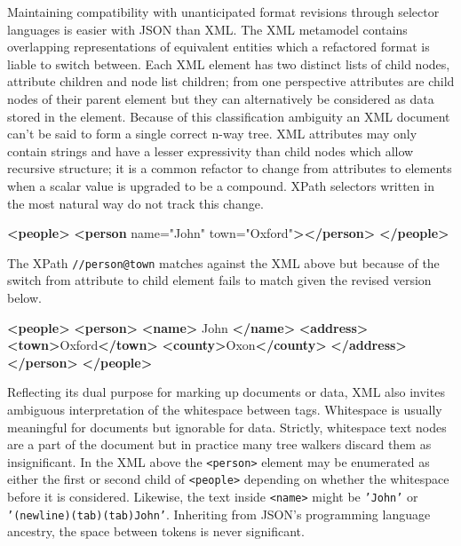 \documentclass[12pt, ]{article}
\newenvironment{Shaded}{}{}
\newcommand{\KeywordTok}[1]{\textcolor[rgb]{0.00,0.44,0.13}{\textbf{{#1}}}}
\newcommand{\StringTok}[1]{\textcolor[rgb]{0.25,0.44,0.63}{{#1}}}
\newcommand{\OtherTok}[1]{\textcolor[rgb]{0.00,0.44,0.13}{{#1}}}
\newcommand{\NormalTok}[1]{{#1}}
\begin{document}
Maintaining compatibility with unanticipated format revisions through
selector languages is easier with JSON than XML. The XML metamodel
contains overlapping representations of equivalent entities which a
refactored format is liable to switch between. Each XML element has two
distinct lists of child nodes, attribute children and node list
children; from one perspective attributes are child nodes of their
parent element but they can alternatively be considered as data stored
in the element. Because of this classification ambiguity an XML document
can't be said to form a single correct n-way tree. XML attributes may
only contain strings and have a lesser expressivity than child nodes
which allow recursive structure; it is a common refactor to change from
attributes to elements when a scalar value is upgraded to be a compound.
XPath selectors written in the most natural way do not track this
change.

\begin{Shaded}
\begin{Highlighting}[]
\KeywordTok{<people>}
   \KeywordTok{<person}\OtherTok{ name=}\StringTok{"John"}\OtherTok{ town=}\StringTok{"Oxford"}\KeywordTok{></person>}
\KeywordTok{</people>}
\end{Highlighting}
\end{Shaded}

The XPath \texttt{//person@town} matches against the XML above but
because of the switch from attribute to child element fails to match
given the revised version below.

\begin{Shaded}
\begin{Highlighting}[]
\KeywordTok{<people>}
   \KeywordTok{<person>}
      \KeywordTok{<name>}
         \NormalTok{John}
      \KeywordTok{</name>}
      \KeywordTok{<address>}
         \KeywordTok{<town>}\NormalTok{Oxford}\KeywordTok{</town>} \KeywordTok{<county>}\NormalTok{Oxon}\KeywordTok{</county>}
      \KeywordTok{</address>}
   \KeywordTok{</person>}
\KeywordTok{</people>}
\end{Highlighting}
\end{Shaded}

Reflecting its dual purpose for marking up documents or data, XML also
invites ambiguous interpretation of the whitespace between tags.
Whitespace is usually meaningful for documents but ignorable for data.
Strictly, whitespace text nodes are a part of the document but in
practice many tree walkers discard them as insignificant. In the XML
above the \texttt{\textless{}person\textgreater{}} element may be
enumerated as either the first or second child of
\texttt{\textless{}people\textgreater{}} depending on whether the
whitespace before it is considered. Likewise, the text inside
\texttt{\textless{}name\textgreater{}} might be \texttt{'John'} or
\texttt{'(newline)(tab)(tab)John'}. Inheriting from JSON's programming
language ancestry, the space between tokens is never significant.
\end{document}
